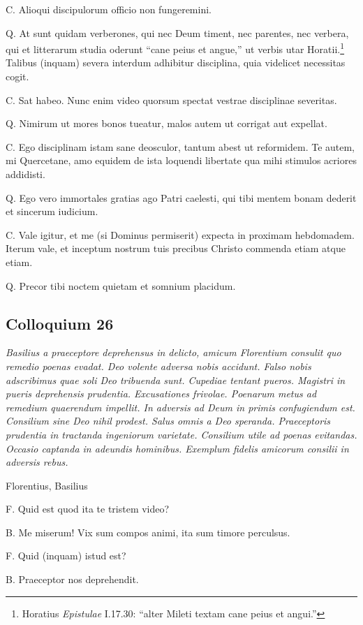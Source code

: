 \documentclass{article}
\begin{document}
C. Alioqui discipulorum officio non fungeremini.

Q. At sunt quidam verberones, qui nec Deum timent, nec parentes, nec verbera, qui et litterarum studia oderunt ``cane peius et angue,'' ut verbis utar Horatii.\footnote{Horatius \emph{Epistulae} I.17.30: ``alter Mileti textam cane peius et angui.''} Talibus (inquam) severa interdum adhibitur disciplina, quia videlicet necessitas cogit.

C. Sat habeo. Nunc enim video quorsum spectat vestrae disciplinae severitas.

Q. Nimirum ut mores bonos tueatur, malos autem ut corrigat aut expellat.

C. Ego disciplinam istam sane deosculor, tantum abest ut reformidem. Te autem, mi Quercetane, amo equidem de ista loquendi libertate qua mihi stimulos acriores addidisti.

Q. Ego vero immortales gratias ago Patri caelesti, qui tibi mentem bonam dederit et sincerum iudicium.

C. Vale igitur, et me (si Dominus permiserit) expecta in proximam hebdomadem. Iterum vale, et inceptum nostrum tuis precibus Christo commenda etiam atque etiam.

Q. Precor tibi noctem quietam et somnium placidum.

\subsection{Colloquium 26}
\emph{Basilius a praeceptore deprehensus in delicto, amicum Florentium consulit quo remedio poenas evadat. Deo volente adversa nobis accidunt. Falso nobis adscribimus quae soli Deo tribuenda sunt. Cupediae tentant pueros. Magistri in pueris deprehensis prudentia. Excusationes frivolae. Poenarum metus ad remedium quaerendum impellit. In adversis ad Deum in primis confugiendum est. Consilium sine Deo nihil prodest. Salus omnis a Deo speranda. Praeceptoris prudentia in tractanda ingeniorum varietate. Consilium utile ad poenas evitandas. Occasio captanda in adeundis hominibus. Exemplum fidelis amicorum consilii in adversis rebus.}

Florentius, Basilius

F. Quid est quod ita te tristem video?

B. Me miserum! Vix sum compos animi, ita sum timore perculsus.

F. Quid (inquam) istud est?

B. Praeceptor nos deprehendit.
\end{document}
